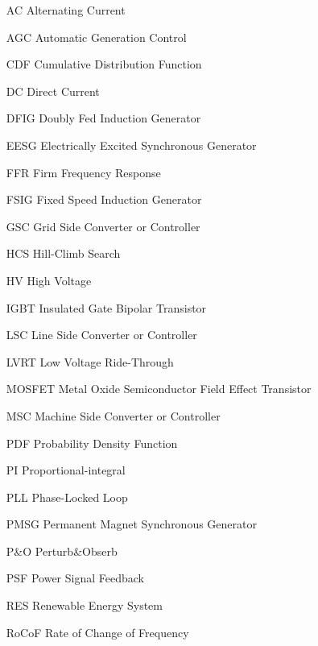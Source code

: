 \begin{glossary}{}

\begin{itemize}[leftmargin=4.5em,align=parleft,labelsep=1cm]
	
\item[AC] 		Alternating Current
\item[AGC] 		Automatic Generation Control
\item[CDF] 		Cumulative Distribution Function
\item[DC] 		Direct Current
\item[DFIG] 	Doubly Fed Induction Generator
\item[EESG] 	Electrically Excited Synchronous Generator
\item[FFR] 		Firm Frequency Response
\item[FSIG] 	Fixed Speed Induction Generator
\item[GSC] 		Grid Side Converter or Controller
\item[HCS] 		Hill-Climb Search
\item[HV]		High Voltage
\item[IGBT] 	Insulated Gate Bipolar Transistor
\item[LSC] 		Line Side Converter or Controller
\item[LVRT] 	Low Voltage Ride-Through
\item[MOSFET] 	Metal Oxide Semiconductor Field Effect Transistor
\item[MSC] 		Machine Side Converter or Controller
\item[PDF] 		Probability Density Function
\item[PI] 		Proportional-integral
\item[PLL] 		Phase-Locked Loop
\item[PMSG] 	Permanent Magnet Synchronous Generator
\item[P\&O] 	Perturb\&Obserb
\item[PSF] 		Power Signal Feedback
\item[RES] 		Renewable Energy System
\item[RoCoF] 	Rate of Change of Frequency

\end{itemize}

\end{glossary}
